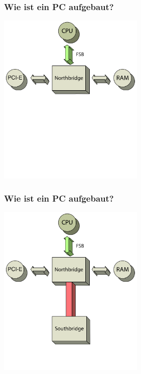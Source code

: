 \documentclass{beamer}
\begin{document}
\begin{frame}[t]
\frametitle{Wie ist ein PC aufgebaut?}
\centering
\includegraphics[width=7cm]{architecture5.png}
\end{frame}

\begin{frame}[t]
\frametitle{Wie ist ein PC aufgebaut?}
\centering
\includegraphics[width=7cm]{architecture6.png}
\end{frame}
\end{document}
